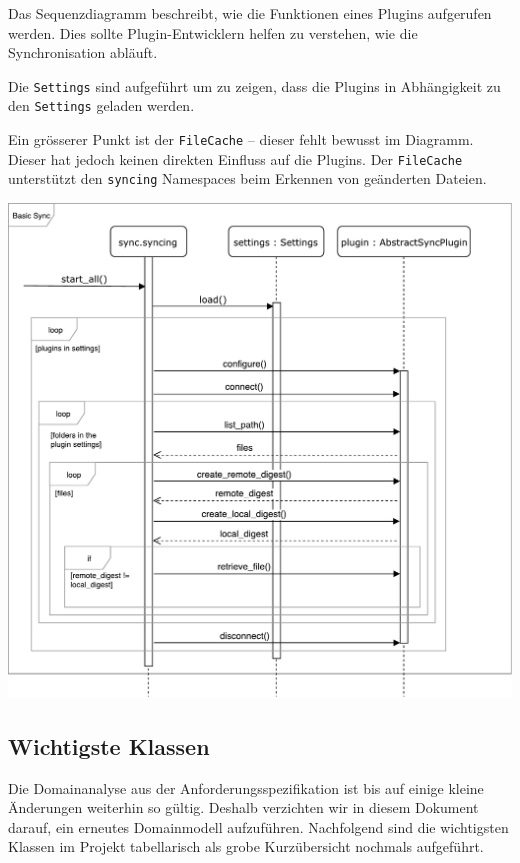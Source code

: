 \documentclass[a4paper]{article}
\begin{document}
Das Sequenzdiagramm beschreibt, wie die Funktionen eines Plugins aufgerufen werden.
Dies sollte Plugin-Entwicklern helfen zu verstehen, wie die Synchronisation abläuft.

Die \verb|Settings| sind aufgeführt um zu zeigen, dass die Plugins in Abhängigkeit zu den \verb|Settings| geladen werden.

Ein grösserer Punkt ist der \verb|FileCache| -- dieser fehlt bewusst im Diagramm.
Dieser hat jedoch keinen direkten Einfluss auf die Plugins.
Der \verb|FileCache| unterstützt den \verb|syncing| Namespaces beim Erkennen von geänderten Dateien.

\includegraphics[width=40em]{./img/GrobesSequenzDiagramm.pdf}

\pagebreak
\subsection{Wichtigste Klassen}

Die Domainanalyse aus der Anforderungsspezifikation ist bis auf einige kleine
Änderungen weiterhin so gültig. Deshalb verzichten wir in diesem Dokument
darauf, ein erneutes Domainmodell aufzuführen. Nachfolgend sind die wichtigsten
Klassen im Projekt tabellarisch als grobe Kurzübersicht nochmals aufgeführt.
\end{document}
